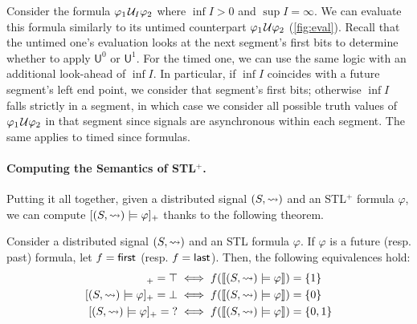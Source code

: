 \bgroup \color{red}
\begin{remark}
	Consider the formula $\varphi_1 \kern.1em\mathcal{U}_I \varphi_2$ where $\inf I > 0$ and $\sup I = \infty$.
	We can evaluate this formula similarly to its untimed counterpart $\varphi_1 \kern.1em\mathcal{U} \varphi_2$ (\cref{fig:eval}).
	Recall that the untimed one's evaluation looks at the next segment's first bits to determine whether to apply $\mathsf{U}^0$ or $\mathsf{U}^1$.
	For the timed one, we can use the same logic with an additional look-ahead of $\inf I$.
	In particular, if $\inf I$ coincides with a future segment's left end point, we consider that segment's first bits; otherwise $\inf I$ falls strictly in a segment, in which case we consider all possible truth values of $\varphi_1 \kern.1em\mathcal{U} \varphi_2$ in that segment since signals are asynchronous within each segment.
	The same applies to timed since formulas.
\end{remark}
\egroup


\paragraph*{Computing the Semantics of STL$^+$.}

Putting it all together, given a distributed signal $(S, {\rightsquigarrow})$ and an STL$^+$ formula $\varphi$, we can compute $[(S,{\rightsquigarrow}) \models \varphi]_+$ thanks to the following theorem.

\bgroup \color{red}
\begin{theorem} \label{cl:algo}
	Consider a distributed signal $(S,{\rightsquigarrow})$ and an STL formula $\varphi$.
	If $\varphi$ is a future (resp. past) formula, let $f = \textsf{first}$ (resp. $f = \textsf{last}$).
	Then, the following equivalences hold:
	\begin{align*}
		[(S,{\hb}) \models \varphi]_+ = \top &\iff f(\llbracket (S, {\hb}) \models \varphi \rrbracket) = \{1\}\\
		[(S,{\hb}) \models \varphi]_+ = \bot &\iff f(\llbracket (S, {\hb}) \models \varphi \rrbracket) = \{0\}\\
		[(S,{\hb}) \models \varphi]_+ = {?} &\iff f(\llbracket (S, {\hb}) \models \varphi \rrbracket) = \{0,1\}
	\end{align*}
\end{theorem}
\egroup

